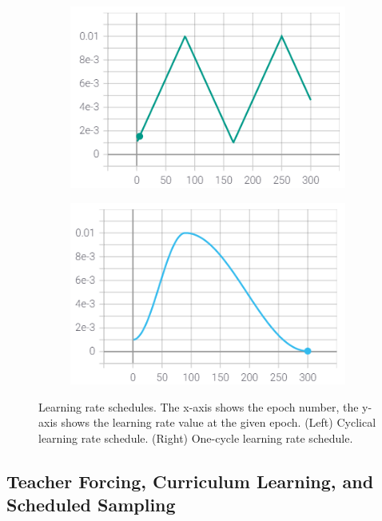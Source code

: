 \begin{figure}
  \centering
  \begin{subfigure}{0.48\textwidth}
    \includegraphics[scale=.9]{figures/png/cyclic_lr.png}
  \end{subfigure}
  \begin{subfigure}{0.48\textwidth}
    \includegraphics[scale=.9]{figures/png/one_cycle_lr.png}
  \end{subfigure}
  \caption{Learning rate schedules. The x-axis shows the epoch number, the y-axis shows the learning rate value at the given epoch. (Left) Cyclical learning rate schedule. (Right) One-cycle learning rate schedule.}
  \label{fig:learning_rate_schedules}
\end{figure}

\subsection*{Teacher Forcing, Curriculum Learning, and Scheduled Sampling}
\label{subsec:teacher_forcing}

